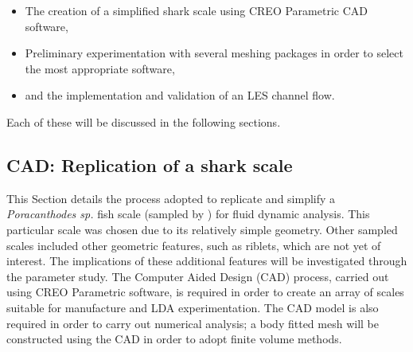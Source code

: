 \documentclass[12pt,oneside,a4paper]{article}
\begin{document}
\begin{itemize}
\itemsep0em
\item The creation of a simplified shark scale using CREO Parametric CAD software,

\item Preliminary experimentation with several meshing packages in order to select the most appropriate software,

\item and the implementation and validation of an LES channel flow.
\end{itemize}

Each of these will be discussed in the following sections.

\subsection{CAD: Replication of a shark scale}
\label{section:cad}
This Section details the process adopted to replicate and simplify a \textit{Poracanthodes sp.} fish scale (sampled by \cite{fletcher2014phd}) for fluid dynamic analysis. This particular scale was chosen due to its relatively simple geometry. Other sampled scales included other geometric features, such as riblets, which are not yet of interest. The implications of these additional features will be investigated through the parameter study. The Computer Aided Design (CAD) process, carried out using CREO Parametric software, is required in order to create an array of scales suitable for manufacture and LDA experimentation. The CAD model is also required in order to carry out numerical analysis; a body fitted mesh will be constructed using the CAD in order to adopt finite volume methods.
\end{document}
